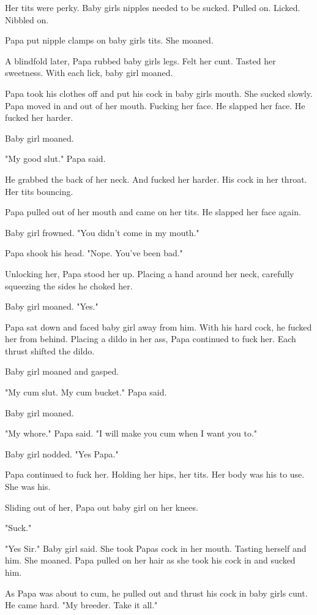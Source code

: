      Her tits were perky. Baby girls nipples needed to be sucked. Pulled on. Licked. Nibbled on.

     Papa put nipple clamps on baby girls tits. She moaned.

     A blindfold later, Papa rubbed baby girls legs. Felt her cunt. Tasted her sweetness. With each lick, baby girl moaned.

     Papa took his clothes off and put his cock in baby girls mouth. She sucked slowly. Papa moved in and out of her mouth. Fucking her face. He slapped her face. He fucked her harder.

     Baby girl moaned. 

     "My good slut." Papa said.

     He grabbed the back of her neck. And fucked her harder. His cock in her throat. Her tits bouncing.

     Papa pulled out of her mouth and came on her tits. He slapped her face again.

     Baby girl frowned. "You didn't come in my mouth."

     Papa shook his head. "Nope. You've been bad."

     Unlocking her, Papa stood her up. Placing a hand around her neck, carefully squeezing the sides he choked her.

     Baby girl moaned. "Yes."

     Papa sat down and faced baby girl away from him. With his hard cock, he fucked her from behind. Placing a dildo in her ass, Papa continued to fuck her. Each thrust shifted the dildo.

     Baby girl moaned and gasped.

     "My cum slut. My cum bucket." Papa said.

     Baby girl moaned.

     "My whore." Papa said. "I will make you cum when I want you to."

     Baby girl nodded. "Yes Papa."

     Papa continued to fuck her. Holding her hips, her tits. Her body was his to use. She was his.

     Sliding out of her, Papa out baby girl on her knees.

     "Suck."

     "Yes Sir." Baby girl said. She took Papas cock in her mouth. Tasting herself and him. She moaned. Papa pulled on her hair as she took his cock in and sucked him.

     As Papa was about to cum, he pulled out and thrust his cock in baby girls cunt. He came hard. "My breeder. Take it all."


